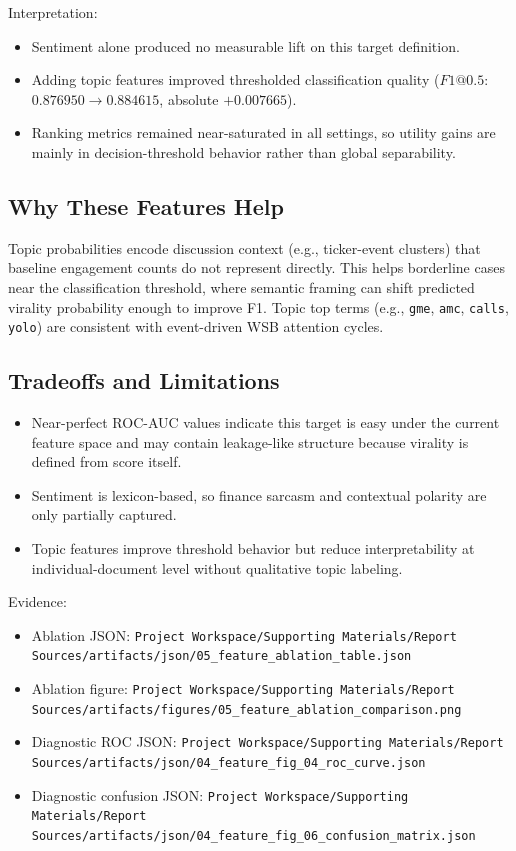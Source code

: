 Interpretation:
\begin{itemize}
  \item Sentiment alone produced no measurable lift on this target definition.
  \item Adding topic features improved thresholded classification quality (\(F1@0.5\): \(0.876950 \rightarrow 0.884615\), absolute \(+0.007665\)).
  \item Ranking metrics remained near-saturated in all settings, so utility gains are mainly in decision-threshold behavior rather than global separability.
\end{itemize}

\subsection{Why These Features Help}
Topic probabilities encode discussion context (e.g., ticker-event clusters) that baseline engagement counts do not represent directly. This helps borderline cases near the classification threshold, where semantic framing can shift predicted virality probability enough to improve F1. Topic top terms (e.g., \texttt{gme}, \texttt{amc}, \texttt{calls}, \texttt{yolo}) are consistent with event-driven WSB attention cycles.

\subsection{Tradeoffs and Limitations}
\begin{itemize}
  \item Near-perfect ROC-AUC values indicate this target is easy under the current feature space and may contain leakage-like structure because virality is defined from score itself.
  \item Sentiment is lexicon-based, so finance sarcasm and contextual polarity are only partially captured.
  \item Topic features improve threshold behavior but reduce interpretability at individual-document level without qualitative topic labeling.
\end{itemize}

Evidence:
\begin{itemize}
  \item Ablation JSON: \verb|Project Workspace/Supporting Materials/Report Sources/artifacts/json/05_feature_ablation_table.json|
  \item Ablation figure: \verb|Project Workspace/Supporting Materials/Report Sources/artifacts/figures/05_feature_ablation_comparison.png|
  \item Diagnostic ROC JSON: \verb|Project Workspace/Supporting Materials/Report Sources/artifacts/json/04_feature_fig_04_roc_curve.json|
  \item Diagnostic confusion JSON: \verb|Project Workspace/Supporting Materials/Report Sources/artifacts/json/04_feature_fig_06_confusion_matrix.json|
\end{itemize}
